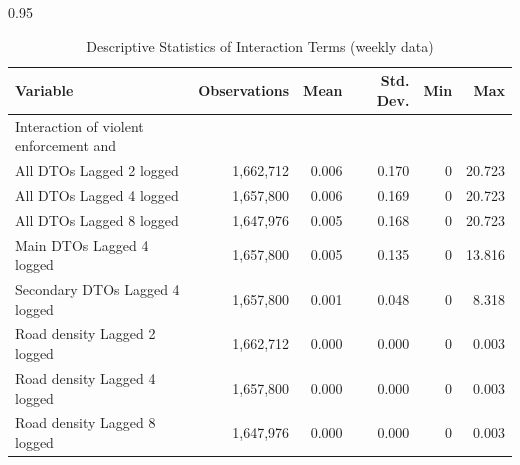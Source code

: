 \documentclass[12pt,letterpaper]{article}
\begin{document}
\newpage


\begin{table}[h!]
\small
    \caption{Descriptive Statistics of Interaction Terms (weekly data)}
    \label{tab:descriptive_interactions}
\begin{spacing}{0.95}
    \centering
    \begin{tabular}{lrrrrr}
    \hline
	Variable       	&	 Observations 	&	Mean	&	Std. Dev.	&	Min	&	Max	 \\	\hline
													
	Interaction of violent enforcement and	&		&		&		&		&		 \\
	\hspace{1em} All DTOs Lagged 2 logged	&	 1,662,712 	&	0.006	&	0.170	&	0	&	20.723	 \\
	\hspace{1em} All DTOs Lagged 4 logged	&	 1,657,800 	&	0.006	&	0.169	&	0	&	20.723	 \\
	\hspace{1em} All DTOs Lagged 8 logged	&	 1,647,976 	&	0.005	&	0.168	&	0	&	20.723	 \\
	\hspace{1em} Main DTOs Lagged 4 logged	&	 1,657,800 	&	0.005	&	0.135	&	0	&	13.816	 \\
	\hspace{1em} Secondary DTOs Lagged 4 logged	&	 1,657,800 	&	0.001	&	0.048	&	0	&	8.318	 \\
	\hspace{1em} Road density Lagged 2 logged	&	 1,662,712 	&	0.000	&	0.000	&	0	&	0.003	 \\
	\hspace{1em} Road density Lagged 4 logged	&	 1,657,800 	&	0.000	&	0.000	&	0	&	0.003	 \\
	\hspace{1em} Road density Lagged 8 logged	&	 1,647,976 	&	0.000	&	0.000	&	0	&	0.003	 \\
												

\end{tabular}
\end{spacing}
\end{table}
\end{document}
